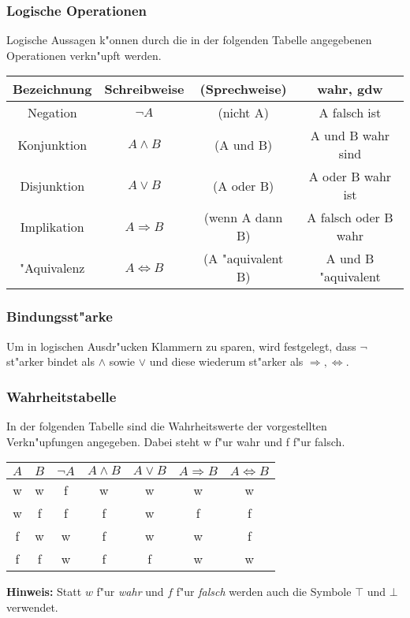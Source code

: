 \documentclass{beamer}
\begin{document}
\begin{frame}
  \frametitle{Logische Operationen}
  Logische Aussagen k"onnen durch die in der folgenden Tabelle angegebenen Operationen verkn"upft werden.
  
  \begin{tabular}[h]{c|cc|c}
   
    Bezeichnung & Schreibweise & (Sprechweise) & wahr, gdw \\
    \hline
    Negation & $\neg A$ & (nicht A) & A falsch ist \\
    Konjunktion & $A\wedge B$ & (A und B) & A und B wahr sind \\
    Disjunktion & $A\vee B$ & (A oder B) & A oder B wahr ist \\
    Implikation & $A\Rightarrow B$ & (wenn A dann B) & A falsch oder B wahr \\
    "Aquivalenz & $A\Leftrightarrow B$ & (A "aquivalent B) & A und B "aquivalent 


    \end{tabular}
\end{frame}

\begin{frame}
  \frametitle{Bindungsst"arke}
  Um in logischen Ausdr"ucken Klammern zu sparen, wird festgelegt, dass $\neg$ st"arker bindet als $\wedge$ sowie $\vee$ und diese wiederum st"arker als $\Rightarrow, \Leftrightarrow$.
\end{frame}

\begin{frame}
  \frametitle{Wahrheitstabelle}
  In der folgenden Tabelle sind die Wahrheitswerte der vorgestellten Verkn"upfungen angegeben. Dabei steht w f"ur wahr und f f"ur falsch.
  \begin{tabular}[h]{c|c|c|c|c|c|c}
   
    $A$ & $B$ & $\neg A$ & $A\wedge B$ & $A\vee B$ & $A\Rightarrow B$ & $A\Leftrightarrow B$ \\
    \hline
    w & w & f & w & w & w & w \\
    w & f & f & f & w & f & f \\
    f & w & w & f & w & w & f \\
    f & f & w & f & f & w & w
    
  \end{tabular}
  
  \vspace{5mm}
  \textbf{Hinweis:} Statt $w$ f"ur \textit{wahr} und $f$ f"ur \textit{falsch} werden auch die Symbole $\top$ und $\bot$ verwendet.
  
\end{frame}
\end{document}
